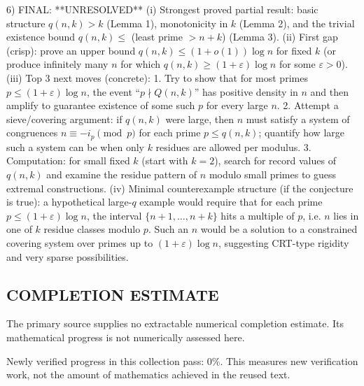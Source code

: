 6) FINAL: **UNRESOLVED**
(i) Strongest proved partial result: basic structure $q(n,k)>k$ (Lemma 1), monotonicity in $k$ (Lemma 2), and the trivial existence bound $q(n,k)\le$ (least prime $>n+k$) (Lemma 3).
(ii) First gap (crisp): prove an upper bound $q(n,k)\le (1+o(1))\log n$ for fixed $k$ (or produce infinitely many $n$ for which $q(n,k)\ge (1+\varepsilon)\log n$ for some $\varepsilon>0$).
(iii) Top 3 next moves (concrete):
  1. Try to show that for most primes $p\le (1+\varepsilon)\log n$, the event ``$p\nmid Q(n,k)$'' has positive density in $n$ and then amplify to guarantee existence of some such $p$ for every large $n$.
  2. Attempt a sieve/covering argument: if $q(n,k)$ were large, then $n$ must satisfy a system of congruences $n\equiv -i_p\pmod p$ for each prime $p\le q(n,k)$; quantify how large such a system can be when only $k$ residues are allowed per modulus.
  3. Computation: for small fixed $k$ (start with $k=2$), search for record values of $q(n,k)$ and examine the residue pattern of $n$ modulo small primes to guess extremal constructions.
(iv) Minimal counterexample structure (if the conjecture is true): a hypothetical large-$q$ example would require that for each prime $p\le (1+\varepsilon)\log n$, the interval $\{n+1,\ldots,n+k\}$ hits a multiple of $p$, i.e. $n$ lies in one of $k$ residue classes modulo $p$. Such an $n$ would be a solution to a constrained covering system over primes up to $(1+\varepsilon)\log n$, suggesting CRT-type rigidity and very sparse possibilities.


\subsection*{COMPLETION ESTIMATE}
The primary source supplies no extractable numerical completion estimate. Its mathematical progress is not numerically assessed here.

Newly verified progress in this collection pass: $0\%$. This measures new verification work, not the amount of mathematics achieved in the reused text.
